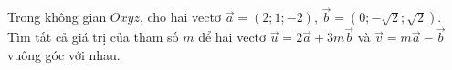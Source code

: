 \begin{ex}
Trong không gian $Oxyz$, cho hai vectơ $\vec a=(2;1;-2)$, $\vec b=\left(0;-\sqrt2;\sqrt2\right)$. Tìm tất cả giá trị của tham số $m$ để hai vectơ $\vec u=2\vec a+3m\vec b$ và $\vec v=m\vec a-\vec b$ vuông góc với nhau.
\end{ex}
